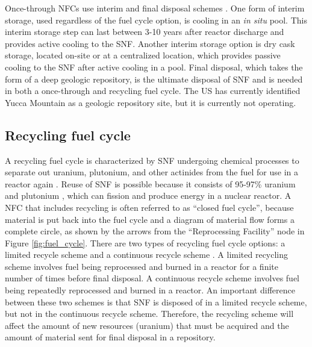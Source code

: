 Once-through \glspl{NFC} use interim and final disposal schemes
\cite{rodriguez-penalonga_review_2017}. One form of interim 
storage, used regardless of 
the fuel cycle option, is cooling in an \textit{in situ} pool. 
This interim storage step can last between 3-10 years after reactor 
discharge \cite{rodriguez-penalonga_review_2017}
and provides active cooling to the \gls{SNF}.
Another interim storage option is dry cask storage, located 
on-site or at a centralized location, which provides passive 
cooling to the \gls{SNF} after active cooling in a pool. 
Final disposal, which takes the form of a 
deep geologic repository, is the ultimate disposal of \gls{SNF} and 
is needed in both a once-through and recycling fuel cycle. The 
US has currently identified Yucca Mountain as a geologic repository 
site, but it is currently not operating.  

\subsection{Recycling fuel cycle}
A recycling fuel cycle is characterized by \gls{SNF} undergoing chemical 
processes to separate out uranium, plutonium, and other 
actinides from the fuel for use in a reactor again \cite{rodriguez-penalonga_review_2017}. 
Reuse of \gls{SNF} is possible because it consists of 95-97\% uranium and 
plutonium \cite{rodriguez-penalonga_review_2017}, which can fission and 
produce energy in a nuclear reactor. A \gls{NFC} that includes 
recycling is often referred to as ``closed fuel cycle'', because material is 
put back into the fuel cycle and a diagram of material flow forms 
a complete circle, as shown by the arrows from the ``Reprocessing Facility''
node in Figure \ref{fig:fuel_cycle}. 
There are two types of recycling fuel cycle options: a limited 
recycle scheme and a continuous recycle scheme \cite{wigeland_nuclear_2014}. 
A limited recycling scheme involves fuel being reprocessed and burned in 
a reactor for a finite number of times before final disposal. A continuous 
recycle scheme involves fuel being repeatedly reprocessed and burned in 
a reactor. An 
important difference between these two schemes is that \gls{SNF} is 
disposed of in a limited recycle scheme, but not in the continuous 
recycle scheme. Therefore, the recycling scheme will affect the amount of 
new resources (uranium) that must be acquired and the amount of material 
sent for final disposal in a repository. 

